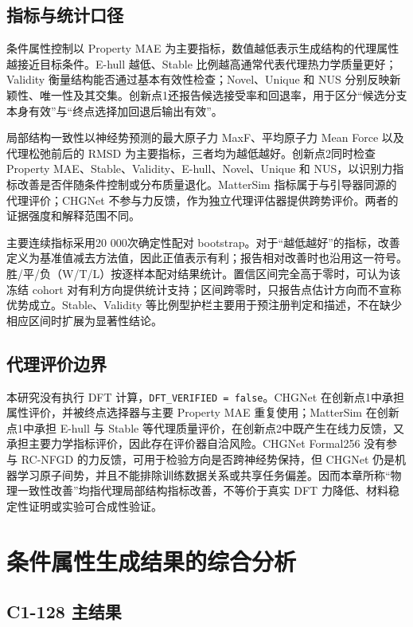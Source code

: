\subsection{指标与统计口径}

条件属性控制以 Property MAE 为主要指标，数值越低表示生成结构的代理属性越接近目标条件。E-hull 越低、Stable 比例越高通常代表代理热力学质量更好；Validity 衡量结构能否通过基本有效性检查；Novel、Unique 和 NUS 分别反映新颖性、唯一性及其交集。创新点1还报告候选接受率和回退率，用于区分``候选分支本身有效''与``终点选择加回退后输出有效''。

局部结构一致性以神经势预测的最大原子力 MaxF、平均原子力 Mean Force 以及代理松弛前后的 RMSD 为主要指标，三者均为越低越好。创新点2同时检查 Property MAE、Stable、Validity、E-hull、Novel、Unique 和 NUS，以识别力指标改善是否伴随条件控制或分布质量退化。Matter\allowbreak Sim 指标属于与引导器同源的代理评价；CHGNet 不参与力反馈，作为独立代理评估器提供跨势评价。两者的证据强度和解释范围不同。

主要连续指标采用20 000次确定性配对 bootstrap。对于``越低越好''的指标，改善定义为基准值减去方法值，因此正值表示有利；报告相对改善时也沿用这一符号。胜/平/负（W/T/L）按逐样本配对结果统计。置信区间完全高于零时，可认为该冻结 cohort 对有利方向提供统计支持；区间跨零时，只报告点估计方向而不宣称优势成立。Stable、Validity 等比例型护栏主要用于预注册判定和描述，不在缺少相应区间时扩展为显著性结论。

\subsection{代理评价边界}

本研究没有执行 DFT 计算，\texttt{DFT\_VERIFIED\ =\ false}。CHGNet 在创新点1中承担属性评价，并被终点选择器与主要 Property MAE 重复使用；Matter\allowbreak Sim 在创新点1中承担 E-hull 与 Stable 等代理质量评价，在创新点2中既产生在线力反馈，又承担主要力学指标评价，因此存在评价器自洽风险。CHGNet Formal256 没有参与 RC-NFGD 的力反馈，可用于检验方向是否跨神经势保持，但 CHGNet 仍是机器学习原子间势，并且不能排除训练数据关系或共享任务偏差。因而本章所称``物理一致性改善''均指代理局部结构指标改善，不等价于真实 DFT 力降低、材料稳定性证明或实验可合成性验证。

\section{条件属性生成结果的综合分析}

\subsection{C1-128 主结果}

